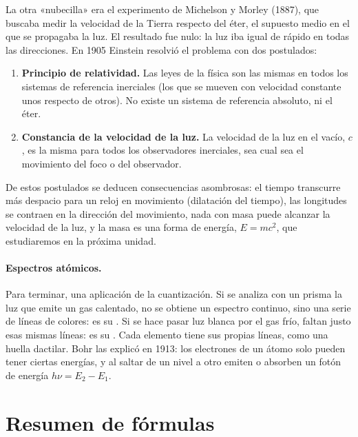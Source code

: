 La otra «nubecilla» era el experimento de Michelson y Morley (1887), que buscaba medir la velocidad de la Tierra respecto del éter, el
supuesto medio en el que se propagaba la luz. El resultado fue nulo: la luz iba igual de rápido en todas las direcciones. En 1905 Einstein
resolvió el problema con dos postulados:
\begin{enumerate}[label=\numberballmDarkTeal]
    \item \textbf{Principio de relatividad.} Las leyes de la física son las mismas en todos los sistemas de referencia inerciales (los
    que se mueven con velocidad constante unos respecto de otros). No existe un sistema de referencia absoluto, ni el éter.
    \item \textbf{Constancia de la velocidad de la luz.} La velocidad de la luz en el vacío, \(c\), es la misma para todos los observadores
    inerciales, sea cual sea el movimiento del foco o del observador.
\end{enumerate}
De estos postulados se deducen consecuencias asombrosas: el tiempo transcurre más despacio para un reloj en movimiento (dilatación del
tiempo), las longitudes se contraen en la dirección del movimiento, nada con masa puede alcanzar la velocidad de la luz, y la masa es una
forma de energía, \(E = mc^2\), que estudiaremos en la próxima unidad.

\paragraph{Espectros atómicos.} Para terminar, una aplicación de la cuantización. Si se analiza con un prisma la luz que emite un gas
calentado, no se obtiene un espectro continuo, sino una serie de líneas de colores: es su . Si se hace pasar luz
blanca por el gas frío, faltan justo esas mismas líneas: es su . Cada elemento tiene sus propias líneas, como
una huella dactilar. Bohr las explicó en 1913: los electrones de un átomo solo pueden tener ciertas energías, y al saltar de un nivel a otro
emiten o absorben un fotón de energía \(h\nu = E_2 - E_1\).

\section{Resumen de fórmulas}\label{sec:cua-resumen}


